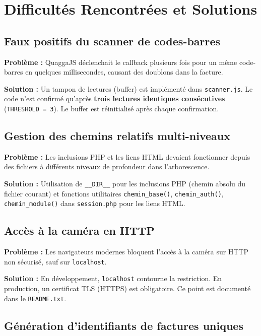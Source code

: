 \documentclass[12pt,a4paper]{report}
\begin{document}
\chapter{Difficultés Rencontrées et Solutions}

\section{Faux positifs du scanner de codes-barres}

\textbf{Problème :} QuaggaJS déclenchait le callback plusieurs fois pour un même
code-barres en quelques millisecondes, causant des doublons dans la facture.

\textbf{Solution :} Un tampon de lectures (buffer) est implémenté dans \texttt{scanner.js}.
Le code n'est confirmé qu'après \textbf{trois lectures identiques consécutives}
(\texttt{THRESHOLD = 3}). Le buffer est réinitialisé après chaque confirmation.

\section{Gestion des chemins relatifs multi-niveaux}

\textbf{Problème :} Les inclusions PHP et les liens HTML devaient fonctionner depuis
des fichiers à différents niveaux de profondeur dans l'arborescence.

\textbf{Solution :} Utilisation de \texttt{\_\_DIR\_\_} pour les inclusions PHP
(chemin absolu du fichier courant) et fonctions utilitaires \texttt{chemin\_base()},
\texttt{chemin\_auth()}, \texttt{chemin\_module()} dans \texttt{session.php} pour
les liens HTML.

\section{Accès à la caméra en HTTP}

\textbf{Problème :} Les navigateurs modernes bloquent l'accès à la caméra sur HTTP
non sécurisé, sauf sur \texttt{localhost}.

\textbf{Solution :} En développement, \texttt{localhost} contourne la restriction.
En production, un certificat TLS (HTTPS) est obligatoire. Ce point est documenté
dans le \texttt{README.txt}.

\section{Génération d'identifiants de factures uniques}
\end{document}
